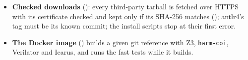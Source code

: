 \begin{itemize}
\item \textbf{Checked downloads} (): every third-party tarball is fetched over HTTPS with its certificate checked and kept only if its SHA-256 matches (); antlr4's tag must be its known commit; the install scripts stop at their first error.
\item \textbf{The Docker image} () builds a given git reference with Z3, \texttt{harm-coi}, Verilator and Icarus, and runs the fast tests while it builds.
\end{itemize}
